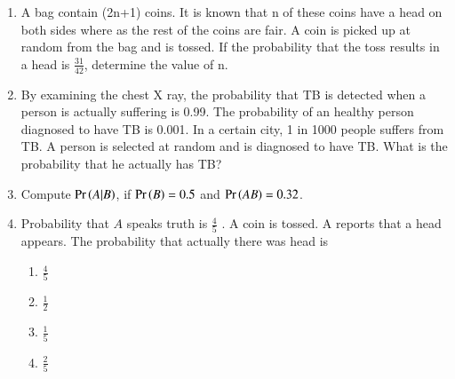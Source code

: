 \begin{enumerate}[label=\thesubsection.\arabic*,ref=\thesubsection.\theenumi]
\solution
%
\item A bag contain (2n+1) coins. It is known that n of these coins have a head on both sides where as the rest of the coins are fair. A coin is picked up at random from the bag and is tossed. If the probability that the toss results in a head is $\frac{31}{42}$, determine the value of n.
%
\item By examining the chest X ray, the probability that TB is detected when a person
is actually suffering is 0.99. The probability of an healthy person diagnosed to 
have TB is 0.001. In a certain city, 1 in 1000 people suffers from TB. A person
is selected at random and is diagnosed to have TB. What is the probability that
he actually has TB? \\
%
	\item Compute $\Pr\left(A|B\right)$, if $\Pr\left(B\right)=0.5$ and $\Pr\left(AB\right)=0.32$. 
	\item Probability that $A$ speaks truth is
$\frac{4}{5}$ . A coin is tossed. A reports that a head
appears. The probability that actually there was head is
\begin{multicols}{4}
\begin{enumerate}
    \item $\frac{4}{5}$ 
\item $\frac{1}{2}$ 
\item $\frac{1}{5}$ 
\item $\frac{2}{5}$
\end{enumerate}
\end{multicols}
\end{enumerate}

